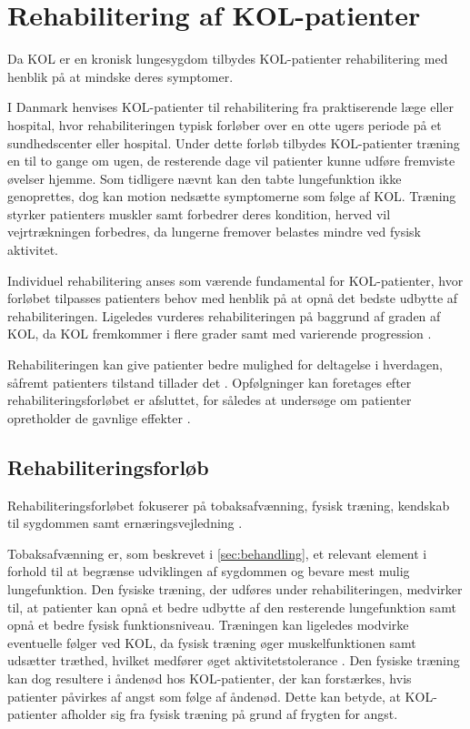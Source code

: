 \section{Rehabilitering af KOL-patienter}
Da KOL er en kronisk lungesygdom tilbydes KOL-patienter rehabilitering med henblik på at mindske deres symptomer. 

I Danmark henvises KOL-patienter til rehabilitering fra praktiserende læge eller hospital, hvor rehabiliteringen typisk forløber over en otte ugers periode på et sundhedscenter eller hospital. Under dette forløb tilbydes KOL-patienter træning en til to gange om ugen, de resterende dage vil patienter kunne udføre fremviste øvelser hjemme.\cite{McCarthy2015,Frausing2011b} Som tidligere nævnt kan den tabte lungefunktion ikke genoprettes, dog kan motion nedsætte symptomerne som følge af KOL. Træning styrker patienters muskler samt forbedrer deres kondition, herved vil vejrtrækningen forbedres, da lungerne fremover belastes mindre ved fysisk aktivitet.\cite{Lungeforeningen2016}

Individuel rehabilitering anses som værende fundamental for KOL-patienter, hvor forløbet tilpasses patienters behov med henblik på at opnå det bedste udbytte af rehabiliteringen.\cite{McCarthy2015,Habraken2011,Sundhedsstyrelsen2015} Ligeledes vurderes rehabiliteringen på baggrund af graden af KOL, da KOL fremkommer i flere grader samt med varierende progression \cite{McCarthy2015}.

Rehabiliteringen kan give patienter bedre mulighed for deltagelse i hverdagen, såfremt patienters tilstand tillader det \cite{McCarthy2015,Habraken2011, Sundhedsstyrelsen2015}. Opfølgninger kan foretages efter rehabiliteringsforløbet er afsluttet, for således at undersøge om patienter opretholder de gavnlige effekter \cite{Frausing2011b}.


\subsection{Rehabiliteringsforløb}
Rehabiliteringsforløbet fokuserer på tobaksafvænning, fysisk træning, kendskab til sygdommen samt ernæringsvejledning \cite{McCarthy2015,Habraken2011,Sundhedsstyrelsen2015}.

Tobaksafvænning er, som beskrevet i \autoref{sec:behandling}, et relevant element i forhold til at begrænse udviklingen af sygdommen og bevare mest mulig lungefunktion. Den fysiske træning, der udføres under rehabiliteringen, medvirker til, at patienter kan opnå et bedre udbytte af den resterende lungefunktion samt opnå et bedre fysisk funktionsniveau.\cite{Sundhedsstyrelsen2015}
Træningen kan ligeledes modvirke eventuelle følger ved KOL, da fysisk træning øger muskelfunktionen samt udsætter træthed, hvilket medfører øget aktivitetstolerance \cite{McCarthy2015}. Den fysiske træning kan dog resultere i åndenød hos KOL-patienter, der kan forstærkes, hvis patienter påvirkes af angst som følge af åndenød. Dette kan betyde, at KOL-patienter afholder sig fra fysisk træning på grund af frygten for angst.\cite{McCarthy2015, Sundhedsstyrelsen2015} 

